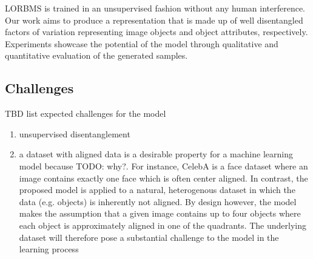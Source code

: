 \documentclass[12pt,a4paper]{article}
\begin{document}
LORBMS is trained in an unsupervised fashion without any human interference. Our work aims to produce a representation that is made up of well disentangled factors of variation representing image objects and object attributes, respectively. Experiments showcase the potential of the model through qualitative and quantitative evaluation of the generated samples.


\subsection{Challenges}
TBD list expected challenges for the model
\begin{enumerate}
  \item unsupervised disentanglement
  \item a dataset with aligned data is a desirable property for a machine learning model because TODO: why?. For instance, CelebA is a face dataset where an image contains exactly one face which is often center aligned. In contrast, the proposed model is applied to a natural, heterogenous dataset in which the data (e.g. objects) is inherently not aligned. By design however, the model makes the assumption that a given image contains up to four objects where each object is approximately aligned in one of the quadrants. The underlying dataset will therefore pose a substantial challenge to the model in the learning process
\end{enumerate}
\end{document}
